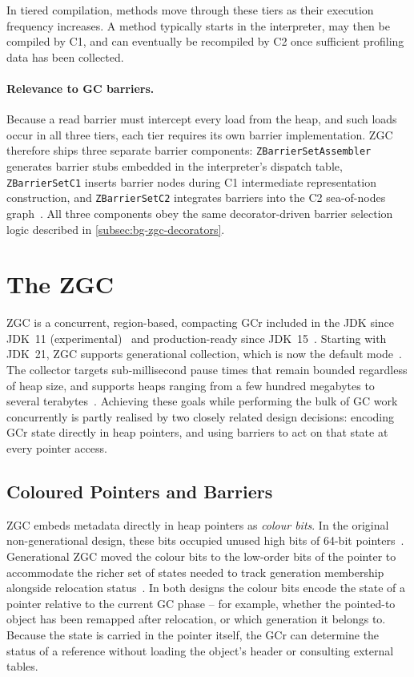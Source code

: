 In tiered compilation, methods move through these tiers as their execution frequency increases. A method typically starts in the interpreter, may then be compiled by C1, and can eventually be recompiled by C2 once sufficient profiling data has been collected.

\paragraph{Relevance to \ac{GC} barriers.} Because a read barrier must intercept every load from the heap, and such loads occur in all three tiers, each tier requires its own barrier implementation. \ac{ZGC} therefore ships three separate barrier components: \texttt{ZBarrierSetAssembler} generates barrier stubs embedded in the interpreter's dispatch table, \texttt{ZBarrierSetC1} inserts barrier nodes during C1 intermediate representation construction, and \texttt{ZBarrierSetC2} integrates barriers into the C2 sea-of-nodes graph~\cite{openjdk-zbarrier-cpp}. All three components obey the same decorator-driven barrier selection logic described in \cref{subsec:bg-zgc-decorators}.


\section{The ZGC}
\label{sec:bg-zgc}

\ac{ZGC} is a concurrent, region-based, compacting \ac{GCr} included in the \ac{JDK} since \ac{JDK}~11 (experimental)~\cite{jep333-zgc} and production-ready since \ac{JDK}~15~\cite{jep377-zgc-prod}. Starting with \ac{JDK}~21, \ac{ZGC} supports generational collection, which is now the default mode~\cite{jep439-genzgc}. The collector targets sub-millisecond pause times that remain bounded regardless of heap size, and supports heaps ranging from a few hundred megabytes to several terabytes~\cite{jep333-zgc,jep439-genzgc,osterlund23-genzgc-beyond}. Achieving these goals while performing the bulk of \ac{GC} work concurrently is partly realised by two closely related design decisions: encoding \ac{GCr} state directly in heap pointers, and using barriers to act on that state at every pointer access.

\subsection{Coloured Pointers and Barriers}
\label{subsec:bg-zgc-pointers}

\ac{ZGC} embeds metadata directly in heap pointers as \emph{colour bits}. In the original non-generational design, these bits occupied unused high bits of 64-bit pointers~\cite{jep333-zgc}. Generational \ac{ZGC} moved the colour bits to the low-order bits of the pointer to accommodate the richer set of states needed to track generation membership alongside relocation status~\cite{jep439-genzgc,openjdk-zaddress-hpp}. In both designs the colour bits encode the state of a pointer relative to the current \ac{GC} phase -- for example, whether the pointed-to object has been remapped after relocation, or which generation it belongs to. Because the state is carried in the pointer itself, the \ac{GCr} can determine the status of a reference without loading the object's header or consulting external tables.

